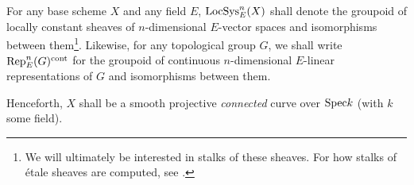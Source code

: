         \begin{convention} \label{conv: categories_of_representations}
            For any base scheme $X$ and any field $E$, $\mathrm{LocSys}^n_E(X)$ shall denote the groupoid of locally constant sheaves of $n$-dimensional $E$-vector spaces and isomorphisms between them\footnote{We will ultimately be interested in stalks of these sheaves. For how stalks of \'etale sheaves are computed, see \cite[\href{https://stacks.math.columbia.edu/tag/03PN}{Tag 03PN}]{stacks}.}. Likewise, for any topological group $G$, we shall write $\mathrm{Rep}_E^n(G)^{\mathrm{cont}}$ for the groupoid of continuous $n$-dimensional $E$-linear representations of $G$ and isomorphisms between them. 
        \end{convention}
        \begin{convention} \label{conv: base_curve}
            Henceforth, $X$ shall be a smooth projective \textit{connected} curve over $\mathrm{Spec} k$ (with $k$ some field).
        \end{convention}
        
